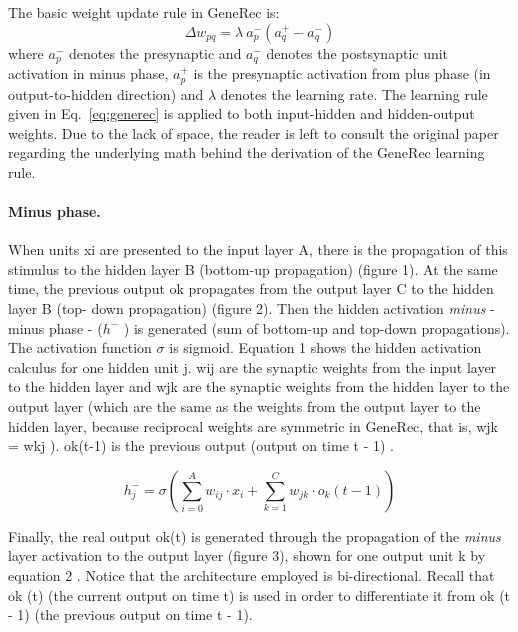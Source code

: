 The basic weight update rule in GeneRec is:
\begin{equation}
  \Delta w_{pq} = \lambda \ a^{-}_p(a^{+}_q - a^{-}_q)
\label{eq:generec}
\end{equation}
where $a^{-}_p$ denotes the presynaptic and $a^{-}_q$ denotes the postsynaptic unit activation in minus phase, $a^{+}_p$ is the presynaptic activation from plus phase (in output-to-hidden direction) and $\lambda$ denotes the learning rate. The learning rule given in Eq.~\ref{eq:generec} is applied to both input-hidden and hidden-output weights.  Due to the lack of space, the reader is left to consult the original paper \citet{o1996bio} regarding the underlying math behind the derivation of the GeneRec learning rule.

\paragraph{Minus phase.} When units xi are presented to the input layer A, there is the propagation of this stimulus to the hidden layer B (bottom-up propagation) (figure 1). At the same time, the previous output ok propagates from the output layer C to the hidden layer B (top- down propagation) (figure 2). Then the hidden activation \emph{minus} - minus phase - ($h^-$ ) is generated (sum of bottom-up and top-down propagations). The activation function $\sigma$ is sigmoid. Equation 1 shows the hidden activation calculus for one hidden unit j. wij are the synaptic weights from the input layer to the hidden layer and wjk are the synaptic weights from the hidden layer to the output layer (which are the same as the weights from the output layer to the hidden layer, because reciprocal weights are symmetric in GeneRec, that is, wjk = wkj \citet{o1996bio}). ok(t-1) is the previous output (output on time t - 1) \citet{orru2008sabio}.

$$h_j^- = \sigma \left(\sum_{i=0}^A w_{ij} \cdot x_i + \sum_{k=1}^C w_{jk} \cdot o_k(t-1)\right)$$

Finally, the real output ok(t) is generated through the propagation of the \emph{minus} layer activation to the output layer (figure 3), shown for one output unit k by equation 2 \citet{o1996bio}. Notice that the architecture employed is bi-directional. Recall that ok (t) (the current output on time t) is used in order to differentiate it from ok (t - 1) (the previous output on time t - 1).

